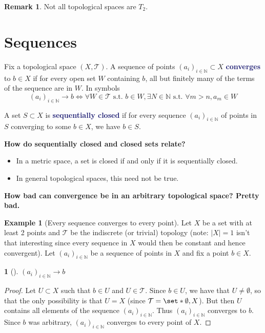 \documentclass[11pt]{article}
\numberwithin{equation}{section}
\newcommand{\navy}[1]{\textcolor{MidnightBlue}{\bf #1}}
\newcounter{theo}[section]\setcounter{theo}{0}
\theoremstyle{definition}
\newtheorem{claim}{\color{ForestGreen}{\textbf{Claim}}}[section]
\theoremstyle{definition}
\newtheorem{example}{\color{WildStrawberry}Example}[section]
\newtheorem*{remark}{Remark}
\def\Set{\set*}%
\def\ss{\subset}
\newcommand{\1}{\mathbbm 1}
\newcommand{\NN}{\mathbb N}
\newcommand{\tT}{\mathcal T}
\begin{document}
\begin{remark}
	Not all topological spaces are $T_2$.
\end{remark}

\section{Sequences}

\begin{definition}[Converges]
	Fix a topological space $(X,\tT)$. A sequence of points $(a_i)_{i \in \NN} \ss X$ \navy{converges} to $b \in X$ if for every open set $W$ containing $b$, all but finitely many of the terms of the sequence are in $W$. In symbols
	\begin{equation*}
		(a_i)_{i \in \NN} \to b \iff \forall W\in \tT \text{ s.t. } b \in W, \exists N \in \NN \text{ s.t. } \forall m > n, a_m \in W
	\end{equation*}
	
\end{definition}

\begin{definition}
	A set $S \ss X$ is \navy{sequentially closed} if for every sequence $(a_i)_{i \in \NN}$ of points in $S$ converging to some $b \in X$, we have $b \in S$. 
\end{definition}

\textbf{How do sequentially closed and closed sets relate?}
\begin{itemize}
	\item In a metric space, a set is closed if and only if it is sequentially closed.
	\item In general topological spaces, this need not be true.
\end{itemize}

\textbf{How bad can convergence be in an arbitrary topological space? Pretty bad.}

\begin{example}[Every sequence converges to every point]
	Let $X$ be a set with at least 2 points and $\tT$ be the indiscrete (or trivial) topology (note: $|X| = 1$ isn't that interesting since every sequence in $X$ would then be constant and hence convergent). Let $(a_i)_{i \in \NN}$ be a sequence of points in $X$ and fix a point $b \in X$.

	\begin{claim}[]
		$(a_i)_{i \in \NN} \to b$ 
	\end{claim}
	\begin{proof}
		Let $U \ss X$ such that $b \in U$ and $U \in \tT$. Since $b \in U$, we have that $U \neq \emptyset$, so that the only possibility is that $U = X$ (since $\tT = \Set{\emptyset,X}$). But then $U$ contains all elements of the sequence  $(a_i)_{i \in \NN}$. Thus $(a_i)_{i \in \NN}$ converges to $b$. Since $b$ was arbitrary, $(a_i)_{i \in \NN}$ converges to every point of $X$.
	\end{proof}
	
\end{example}
\end{document}
